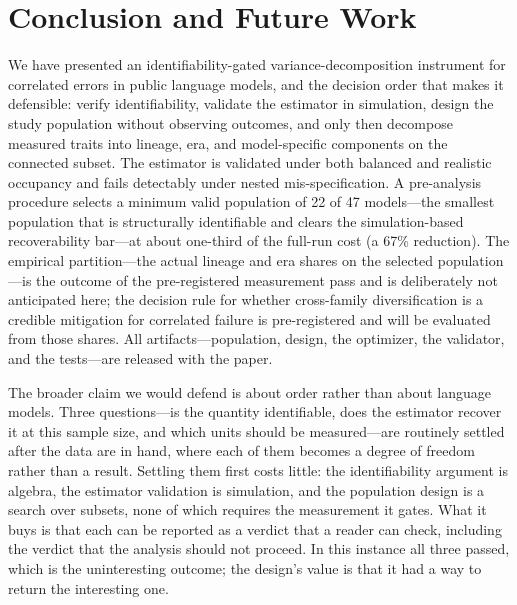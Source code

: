 \documentclass{ieeeaccess}
\theoremstyle{definition}
\theoremstyle{plain}
\begin{document}
\section{Conclusion and Future Work}
\label{sec:conclusion}
We have presented an identifiability-gated variance-decomposition instrument for
correlated errors in public language models, and the decision order that makes it
defensible: verify identifiability, validate the estimator in simulation, design the
study population without observing outcomes, and only then decompose measured
traits into lineage, era, and model-specific components on the connected subset.
The estimator is validated under both balanced and realistic occupancy and fails
detectably under nested mis-specification. A pre-analysis procedure selects a
minimum valid population of 22 of 47 models---the smallest population that is
structurally identifiable and clears the simulation-based recoverability bar---at
about one-third of the full-run cost (a 67\% reduction). The empirical partition---the actual lineage and
era shares on the selected population---is the outcome of the pre-registered
measurement pass and is deliberately not anticipated here; the decision rule for
whether cross-family diversification is a credible mitigation for correlated
failure is pre-registered and will be evaluated from those shares. All
artifacts---population, design, the optimizer, the validator, and the tests---are
released with the paper.

The broader claim we would defend is about order rather than about language
models. Three questions---is the quantity identifiable, does the estimator
recover it at this sample size, and which units should be measured---are
routinely settled after the data are in hand, where each of them becomes a
degree of freedom rather than a result. Settling them first costs little: the
identifiability argument is algebra, the estimator validation is simulation,
and the population design is a search over subsets, none of which requires the
measurement it gates. What it buys is that each can be reported as a verdict
that a reader can check, including the verdict that the analysis should not
proceed. In this instance all three passed, which is the uninteresting outcome;
the design's value is that it had a way to return the interesting one.
\end{document}
